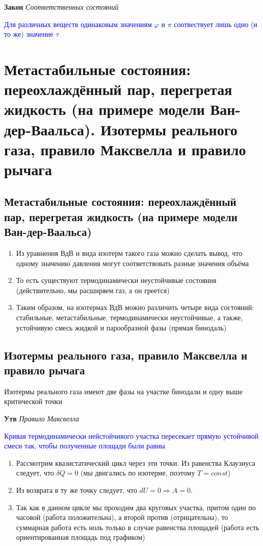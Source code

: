 \documentclass[a4paper, 14pt]{article}
\begin{document}
    \textbf{Закон} \textit{Соответственных состояний}

    \textcolor{blue}{Для различных веществ одинаковым значениям $\varphi$ и $\pi$ соотвествует лишь одно (и то же)
        значение $\tau$}

    \section{Метастабильные состояния: переохлаждённый пар, перегретая жидкость (на примере модели Ван-дер-Ваальса).
    Изотермы реального газа, правило Максвелла и правило рычага}

    \subsection{Метастабильные состояния: переохлаждённый пар, перегретая жидкость (на примере модели Ван-дер-Ваальса)}

    \begin{enumerate}
        \item Из уравнения ВдВ и вида изотерм такого газа можно сделать вывод, что одному значению давления могут
        соответствовать разные значения объёма
        \item То есть существуют термодинамически неустойчивые состояния (действительно, мы расширяем газ, а он греется)
        \item Таким образом, на изотермах ВдВ можно различить четыре вида состояний: стабильные, метастабильные,
        термодинамически неустойчивые, а также, устойчивую смесь жидкой и парообразной фазы (прямая бинодаль)
    \end{enumerate}

    \subsection{Изотермы реального газа, правило Максвелла и правило рычага}

    Изотермы реального газа имеют две фазы на участке бинодали и одну выше критической точки

    \textbf{Утв} \textit{Правило Максвелла}

    \textcolor{blue}{Кривая термодинамически нейстойчивого участка пересекает прямую устойчивой смеси так, чтобы
    полученные площади были равны}

    \begin{enumerate}
        \item Рассмотрим квазистатический цикл через эти точки.
        Из равенства Клаузиуса следует, что $\delta Q = 0$ (мы двигались по изотерме, поэтому $T = const$)
        \item Из возврата в ту же точку следует, что $dU = 0 \Rightarrow A = 0$.
        \item Так как в данном цикле мы проходим два круговых участка, притом один по часовой (работа положительна),
        а второй против (отрицательна), то суммарная работа есть ноль только в случае равенства площадей (работа есть
        ориентированная площадь под графиком)
    \end{enumerate}
\end{document}
